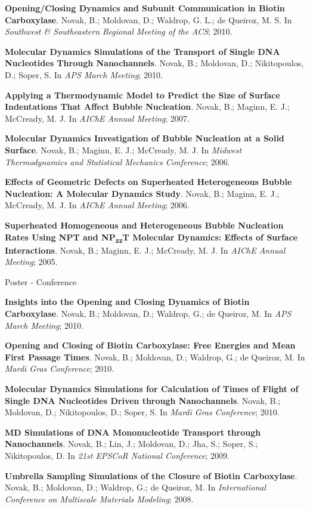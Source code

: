 \begin{cventries}
{\begin{cvitems}
        \item {\textbf{Opening/Closing Dynamics and Subunit Communication in Biotin Carboxylase}. Novak, B.; Moldovan, D.; Waldrop, G. L.; de Queiroz, M. S. In \textit{Southwest \& Southeastern Regional Meeting of the ACS}; 2010.}
        \item {\textbf{Molecular Dynamics Simulations of the Transport of Single DNA Nucleotides Through Nanochannels}. Novak, B.; Moldovan, D.; Nikitopoulos, D.; Soper, S. In \textit{APS March Meeting}; 2010.}
        \item{\textbf{Applying a Thermodynamic Model to Predict the Size of Surface Indentations That Affect Bubble Nucleation}. Novak, B.; Maginn, E. J.; McCready, M. J. In \textit{AIChE Annual Meeting}; 2007.}
        \item {\textbf{Molecular Dynamics Investigation of Bubble Nucleation at a Solid Surface}. Novak, B.; Maginn, E. J.; McCready, M. J. In \textit{Midwest Thermodynamics and Statistical Mechanics Conference}; 2006.}
        \item {\textbf{Effects of Geometric Defects on Superheated Heterogeneous Bubble Nucleation: A Molecular Dynamics Study}. Novak, B.; Maginn, E. J.; McCready, M. J. In \textit{AIChE Annual Meeting}; 2006. }
        \item {\textbf{Superheated Homogeneous and Heterogeneous Bubble Nucleation Rates Using NPT and NP\textsubscript{zz}T Molecular Dynamics: Effects of Surface Interactions}. Novak, B.; Maginn, E. J.; McCready, M. J. In \textit{AIChE Annual Meeting}; 2005.}
      \end{cvitems}
    }
    
  \cventry
    {} %
    {Poster - Conference} %
    {} %
    {} %
    {
      \begin{cvitems}
        \item {\textbf{Insights into the Opening and Closing Dynamics of Biotin Carboxylase}. Novak, B.; Moldovan, D.; Waldrop, G.; de Queiroz, M. In \textit{APS March Meeting}; 2010.}        
        \item {\textbf{Opening and Closing of Biotin Carboxylase: Free Energies and Mean First Passage Times}. Novak, B.; Moldovan, D.; Waldrop, G.; de Queiroz, M. In \textit{Mardi Gras Conference}; 2010.}
        \item {\textbf{Molecular Dynamics Simulations for Calculation of Times of Flight of Single DNA Nucleotides Driven through Nanochannels}. Novak, B.; Moldovan, D.; Nikitopoulos, D.; Soper, S. In \textit{Mardi Gras Conference}; 2010.}
        \item {\textbf{MD Simulations of DNA Mononucleotide Transport through Nanochannels}. Novak, B.; Lin, J.; Moldovan, D.; Jha, S.; Soper, S.; Nikitopoulos, D. In \textit{21st EPSCoR National Conference}; 2009.}
        \item {\textbf{Umbrella Sampling Simulations of the Closure of Biotin Carboxylase}. Novak, B.; Moldovan, D.; Waldrop, G.; de Queiroz, M. In \textit{International Conference on Multiscale Materials Modeling}; 2008.}
      \end{cvitems}
    }
    

\end{cventries}
